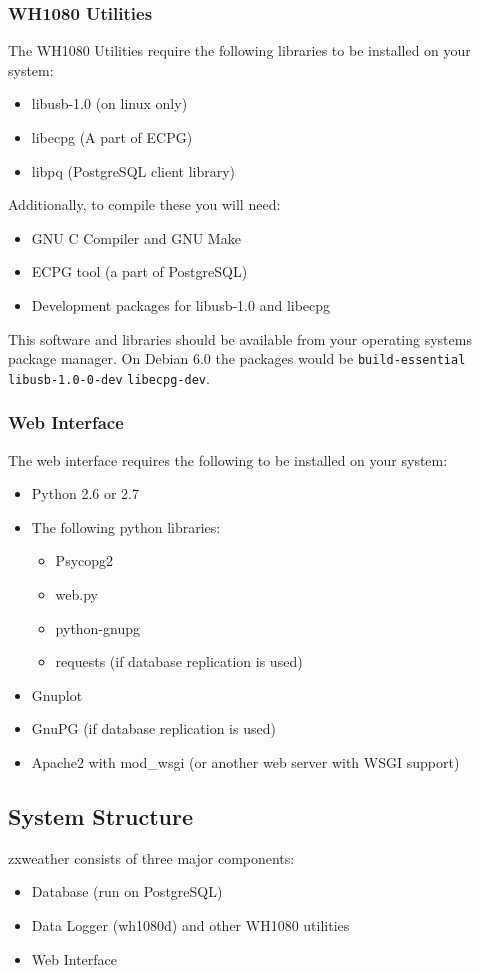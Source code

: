 \documentclass[a4paper,10pt,draft]{book}
\begin{document}
\subsubsection{WH1080 Utilities}
The WH1080 Utilities require the following libraries to be installed on your system:
\begin{itemize}
\item libusb-1.0 (on linux only)
\item libecpg (A part of ECPG)
\item libpq (PostgreSQL client library)
\end{itemize}

Additionally, to compile these you will need:
\begin{itemize}
\item GNU C Compiler and GNU Make
\item ECPG tool (a part of PostgreSQL)
\item Development packages for libusb-1.0 and libecpg
\end{itemize}

This software and libraries should be available from your operating systems package manager. On Debian 6.0 the packages would be \verb|build-essential| \verb|libusb-1.0-0-dev| \verb|libecpg-dev|.

\subsubsection{Web Interface}
The web interface requires the following to be installed on your system:
\begin{itemize}
\item Python 2.6 or 2.7
\item The following python libraries: 
\begin{itemize}
\item Psycopg2
\item web.py
\item python-gnupg
\item requests (if database replication is used)
\end{itemize}
\item Gnuplot
\item GnuPG (if database replication is used)
\item Apache2 with mod\_wsgi (or another web server with WSGI support)
\end{itemize}

\subsection{System Structure}
zxweather consists of three major components:
\begin{itemize}
\item Database (run on PostgreSQL)
\item Data Logger (wh1080d) and other WH1080 utilities
\item Web Interface
\end{itemize}
\end{document}
